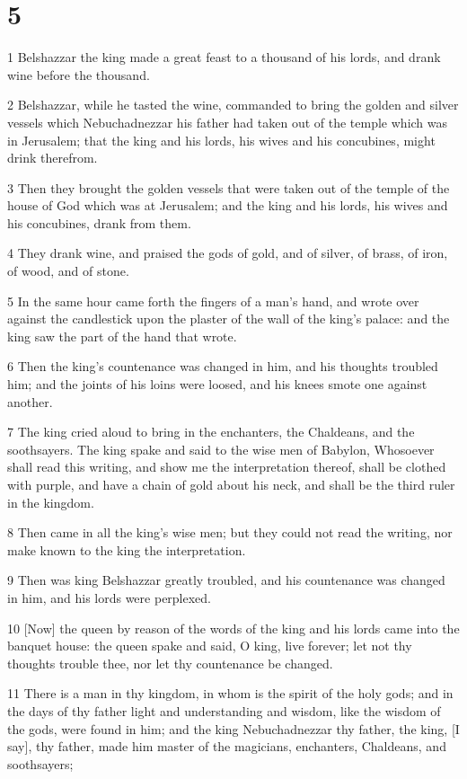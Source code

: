 \chapter{5}

\par 1 Belshazzar the king made a great feast to a thousand of his lords, and drank wine before the thousand.
\par 2 Belshazzar, while he tasted the wine, commanded to bring the golden and silver vessels which Nebuchadnezzar his father had taken out of the temple which was in Jerusalem; that the king and his lords, his wives and his concubines, might drink therefrom.
\par 3 Then they brought the golden vessels that were taken out of the temple of the house of God which was at Jerusalem; and the king and his lords, his wives and his concubines, drank from them.
\par 4 They drank wine, and praised the gods of gold, and of silver, of brass, of iron, of wood, and of stone.
\par 5 In the same hour came forth the fingers of a man's hand, and wrote over against the candlestick upon the plaster of the wall of the king's palace: and the king saw the part of the hand that wrote.
\par 6 Then the king's countenance was changed in him, and his thoughts troubled him; and the joints of his loins were loosed, and his knees smote one against another.
\par 7 The king cried aloud to bring in the enchanters, the Chaldeans, and the soothsayers. The king spake and said to the wise men of Babylon, Whosoever shall read this writing, and show me the interpretation thereof, shall be clothed with purple, and have a chain of gold about his neck, and shall be the third ruler in the kingdom.
\par 8 Then came in all the king's wise men; but they could not read the writing, nor make known to the king the interpretation.
\par 9 Then was king Belshazzar greatly troubled, and his countenance was changed in him, and his lords were perplexed.
\par 10 [Now] the queen by reason of the words of the king and his lords came into the banquet house: the queen spake and said, O king, live forever; let not thy thoughts trouble thee, nor let thy countenance be changed.
\par 11 There is a man in thy kingdom, in whom is the spirit of the holy gods; and in the days of thy father light and understanding and wisdom, like the wisdom of the gods, were found in him; and the king Nebuchadnezzar thy father, the king, [I say], thy father, made him master of the magicians, enchanters, Chaldeans, and soothsayers;

